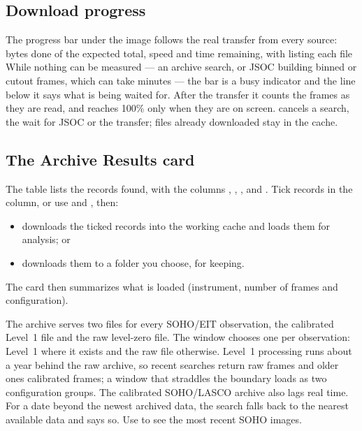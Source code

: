 \subsection{Download progress}
\label{sec:solar-progress}

The progress bar under the image follows the real transfer from every source: bytes done of
the expected total, speed and time remaining, with  listing each file
While nothing can be measured --- an archive search, or
JSOC building binned or cutout frames, which can take minutes --- the bar is a busy indicator
and the line below it says what is being waited for. After the transfer it counts the frames
as they are read, and reaches 100\% only when they are on screen.  cancels a search,
the wait for JSOC or the transfer; files already downloaded stay in the cache.

\subsection{The Archive Results card}
\label{sec:archive-results}

The  table lists the records found, with the columns ,
, ,  and . Tick records in the 
column, or use  and , then:
\begin{itemize}
  \item {} downloads the ticked records into the working cache and loads
    them for analysis; or
  \item {} downloads them to a folder you choose, for keeping.
\end{itemize}
The  card then summarizes what is loaded (instrument, number of frames and
configuration).

\begin{note}
  The archive serves two files for every SOHO/EIT observation, the calibrated Level~1 file
  and the raw level-zero file. The window chooses one per observation: Level~1 where it
  exists and the raw file otherwise. Level~1 processing runs about a year behind the raw
  archive, so recent searches return raw frames and older ones calibrated frames; a window
  that straddles the boundary loads as two configuration groups. The calibrated SOHO/LASCO
  archive also lags real time. For a date beyond the newest archived data, the search falls
  back to the nearest available data and says so. Use  to see the most
  recent SOHO images.
\end{note}

